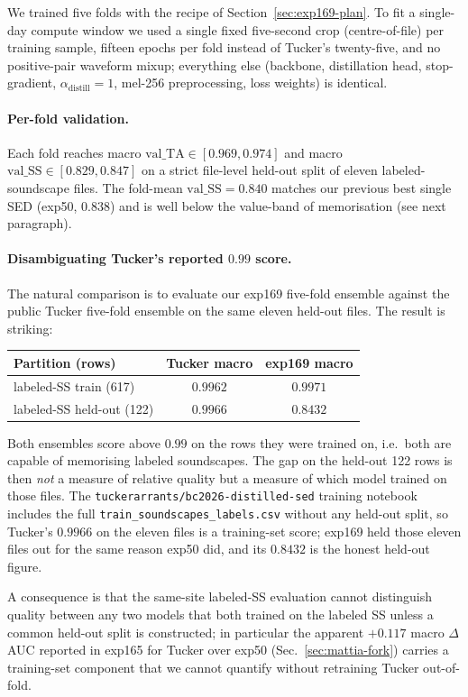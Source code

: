 We trained five folds with the recipe of
Section~\ref{sec:exp169-plan}. To fit a single-day compute window we
used a single fixed five-second crop (centre-of-file) per training
sample, fifteen epochs per fold instead of Tucker's twenty-five, and
no positive-pair waveform mixup; everything else (backbone,
distillation head, stop-gradient, $\alpha_\text{distill}=1$, mel-256
preprocessing, loss weights) is identical.

\paragraph{Per-fold validation.}
Each fold reaches macro $\text{val\_TA} \in [0.969, 0.974]$ and
macro $\text{val\_SS} \in [0.829, 0.847]$ on a strict file-level
held-out split of eleven labeled-soundscape files. The fold-mean
$\text{val\_SS} = 0.840$ matches our previous best single SED
(exp50, $0.838$) and is well below the value-band of memorisation
(see next paragraph).

\paragraph{Disambiguating Tucker's reported $0.99$ score.}
The natural comparison is to evaluate our exp169 five-fold ensemble
against the public Tucker five-fold ensemble on the same eleven
held-out files. The result is striking:
\begin{center}
\begin{tabular}{lcc}
\toprule
Partition (rows) & Tucker macro & exp169 macro \\
\midrule
labeled-SS train (617)        & $0.9962$ & $0.9971$ \\
labeled-SS held-out (122)     & $0.9966$ & $0.8432$ \\
\bottomrule
\end{tabular}
\end{center}
Both ensembles score above $0.99$ on the rows they were trained on,
i.e.\ both are capable of memorising labeled soundscapes. The gap on
the held-out 122 rows is then \emph{not} a measure of relative
quality but a measure of which model trained on those files. The
\texttt{tuckerarrants/bc2026-distilled-sed} training notebook
includes the full \texttt{train\_soundscapes\_labels.csv} without
any held-out split, so Tucker's $0.9966$ on the eleven files is a
training-set score; exp169 held those eleven files out for the same
reason exp50 did, and its $0.8432$ is the honest held-out figure.

A consequence is that the same-site labeled-SS evaluation cannot
distinguish quality between any two models that both trained on
the labeled SS unless a common held-out split is constructed; in
particular the apparent $+0.117$ macro $\Delta$AUC reported in
exp165 for Tucker over exp50 (Sec.~\ref{sec:mattia-fork}) carries a
training-set component that we cannot quantify without retraining
Tucker out-of-fold.

